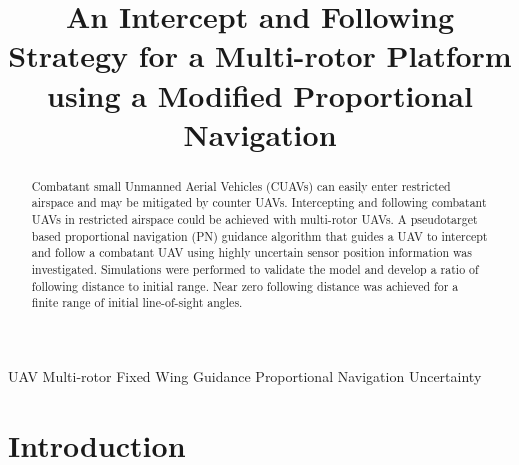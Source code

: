 \documentclass[conference]{IEEEtran}
\begin{document}
\title{An Intercept and Following Strategy for a Multi-rotor Platform using a Modified Proportional Navigation}

\author{
\and
{}
}

\maketitle


\begin{abstract}
	Combatant small Unmanned Aerial Vehicles (CUAVs) can easily enter restricted airspace and may be mitigated by counter UAVs. Intercepting and following combatant UAVs in restricted airspace could be achieved with multi-rotor UAVs. A pseudotarget based proportional navigation (PN) guidance algorithm that guides a UAV to intercept and follow a combatant UAV using highly uncertain sensor position information was investigated. Simulations were performed to validate the model and develop a ratio of following distance to initial range. Near zero following distance was achieved for a finite range of initial line-of-sight angles.
\end{abstract}

\begin{IEEEkeywords}
	UAV
	Multi-rotor
	Fixed Wing
	Guidance
	Proportional Navigation
	Uncertainty

\end{IEEEkeywords}

\section{Introduction}

\end{document}
